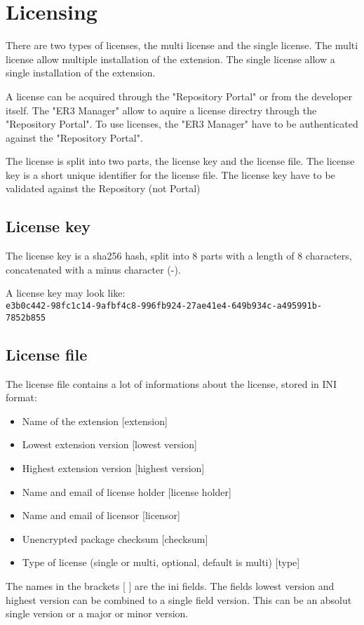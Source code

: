 \label{sec:licensing} 
\chapter{Licensing}


There are two types of licenses, the multi license and the single license.
The multi license allow multiple installation of the extension.
The single license allow a single installation of the extension.

A license can be acquired through the "Repository Portal" or from the developer itself.
The "ER3 Manager" allow to aquire a license directry through the "Repository Portal".
To use licenses, the "ER3 Manager" have to be authenticated against the "Repository Portal".

The license is split into two parts, the license key and the license file.
The license key is a short unique identifier for the license file.
The license key have to be validated against the Repository (not Portal)

\section[sec:license key]{License key}

The license key is a sha256 hash, split into 8 parts with a length of 8 characters, concatenated with a minus character (-).

A license key may look like: \\
\texttt{e3b0c442-98fc1c14-9afbf4c8-996fb924-27ae41e4-649b934c-a495991b-7852b855}

\section[sec:license file]{License file}

The license file contains a lot of informations about the license, stored in INI format:
\begin{itemize}
\item Name of the extension [extension]
\item Lowest extension version [lowest version]
\item Highest extension version [highest version]
\item Name and email of license holder [license holder]
\item Name and email of licensor [licensor]
\item Unencrypted package checksum [checksum]
\item Type of license (single or multi, optional, default is multi) [type]
\end{itemize}
The names in the brackets [ ] are the ini fields.
The fields lowest version and highest version can be combined to a single field version.
This can be an absolut single version or a major or minor version.

